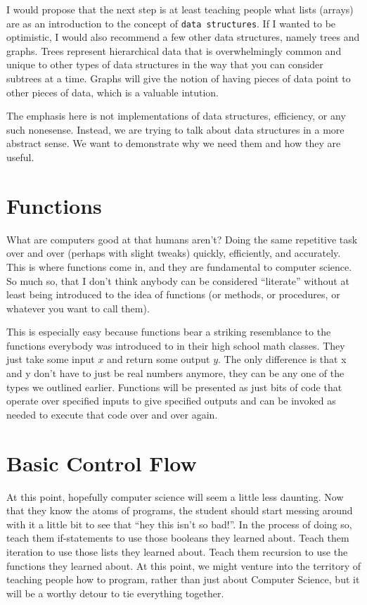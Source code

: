 \documentclass[12pt]{article}
\begin{document}
      I would propose that the next step is at least teaching people what lists (arrays) are as an introduction to the concept of \texttt{data structures}. If I wanted to be optimistic, I would also recommend a few other data structures, namely trees and graphs. Trees represent hierarchical data that is overwhelmingly common and unique to other types of data structures in the way that you can consider subtrees at a time. Graphs will give the notion of having pieces of data point to other pieces of data, which is a valuable intution.  

      The emphasis here is not implementations of data structures, efficiency, or any such nonesense. Instead, we are trying to talk about data structures in a more abstract sense. We want to demonstrate why we need them and how they are useful.

    \section{Functions}

      What are computers good at that humans aren't? Doing the same repetitive task over and over (perhaps with slight tweaks) quickly, efficiently, and accurately. This is where functions come in, and they are fundamental to computer science. So much so, that I don't think anybody can be considered ``literate'' without at least being introduced to the idea of functions (or methods, or procedures, or whatever you want to call them). 

      This is especially easy because functions bear a striking resemblance to the functions everybody was introduced to in their high school math classes. They just take some input $x$ and return some output $y$. The only difference is that x and y don't have to just be real numbers anymore, they can be any one of the types we outlined earlier. Functions will be presented as just bits of code that operate over specified inputs to give specified outputs and can be invoked as needed to execute that code over and over again.  

    \section{Basic Control Flow}

      At this point, hopefully computer science will seem a little less daunting. Now that they know the atoms of programs, the student should start messing around with it a little bit to see that ``hey this isn't so bad!''. In the process of doing so, teach them if-statements to use those booleans they learned about. Teach them iteration to use those lists they learned about. Teach them recursion to use the functions they learned about. At this point, we might venture into the territory of teaching people how to program, rather than just about Computer Science, but it will be a worthy detour to tie everything together.  
\end{document}
